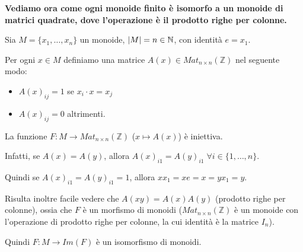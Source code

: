 \documentclass[../main.tex]{subfiles}
\begin{document}
\textbf{Vediamo ora come ogni monoide finito è isomorfo a un monoide di matrici quadrate, dove l'operazione
    è il prodotto righe per colonne.}

Sia $M=\{x_1,\ldots,x_n\}$ un monoide, $\lvert M\rvert = n \in \mathbb{N}$, con identità $e = x_1$.

Per ogni $x \in M$ definiamo una matrice $A(x) \in Mat_{n \times n}(\mathbb{Z})$ nel seguente modo:
\begin{itemize}
    \item $A(x)_{ij} = 1$ se $x_i \cdot x = x_j$
    \item $A(x)_{ij} = 0$ altrimenti.
\end{itemize}
La funzione $F : M \rightarrow Mat_{n \times n} (\mathbb{Z})$ ($x \mapsto A(x)$) è iniettiva.

Infatti, se $A(x) = A(y)$, allora $A(x)_{i1} = A(y)_{i1} \; \forall i \in \{1,\ldots,n\}$.

Quindi se $A(x)_{i1} = A(y)_{i1} = 1$, allora $xx_1 = xe = x = yx_1 = y$.

Risulta inoltre facile vedere che $A(xy) = A(x)A(y)$ (prodotto righe per colonne), ossia che $F$ è un morfismo di monoidi ($Mat_{n \times n}(\mathbb{Z})$ è un monoide con l'operazione di prodotto righe per colonne, la cui identità è la matrice $I_n$).

Quindi $F: M \rightarrow Im(F)$ è un isomorfismo di monoidi.
\end{document}
